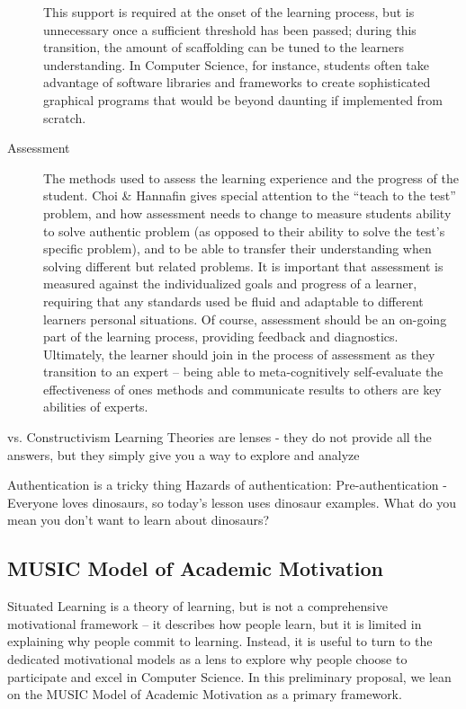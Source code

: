\begin{description}
	This support is required at the onset of the learning process, but is unnecessary once a sufficient threshold has been passed; during this transition, the amount of scaffolding can be tuned to the learners understanding.
	In Computer Science, for instance, students often take advantage of software libraries and frameworks to create sophisticated graphical programs that would be beyond daunting if implemented from scratch.
	\item[Assessment] The methods used to assess the learning experience and the progress of the student.
	Choi \& Hannafin gives special attention to the “teach to the test” problem, and how assessment needs to change to measure students ability to solve authentic problem (as opposed to their ability to solve the test’s specific problem), and to be able to transfer their understanding when solving different but related problems.
	It is important that assessment is measured against the individualized goals and progress of a learner, requiring that any standards used be fluid and adaptable to different learners personal situations.
	Of course, assessment should be an on-going part of the learning process, providing feedback and diagnostics.
	Ultimately, the learner should join in the process of assessment as they transition to an expert – being able to meta-cognitively self-evaluate the effectiveness of ones methods and communicate results to others are key abilities of experts. 
\end{description}


vs. Constructivism
Learning Theories are lenses - they do not provide all the answers, but they simply give you a way to explore and analyze

Authentication is a tricky thing 
Hazards of authentication:
Pre-authentication - Everyone loves dinosaurs, so today's lesson uses dinosaur examples. What do you mean you don't want to learn about dinosaurs?

\subsection{MUSIC Model of Academic Motivation}

Situated Learning is a theory of learning, but is not a comprehensive motivational framework -- it describes how people learn, but it is limited in explaining why people commit to learning.
Instead, it is useful to turn to the dedicated motivational models as a lens to explore why people choose to participate and excel in Computer Science.
In this preliminary proposal, we lean on the MUSIC Model of Academic Motivation as a primary framework.


